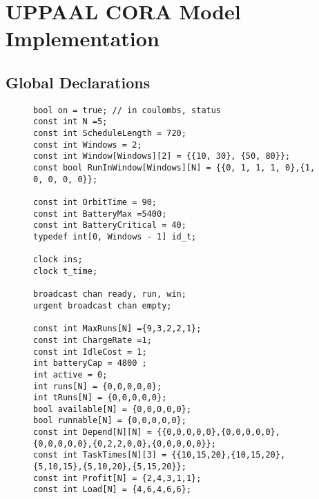 \chapter{UPPAAL CORA Model Implementation}\label{appendix:cora_models}

\section{Global Declarations}
\begin{figure}[H]
\begin{lstlisting}[language=my_c, caption={Global declarations}, label=lst:core_global_declarations_code0]
bool on = true; // in coulombs, status
const int N =5;
const int ScheduleLength = 720;
const int Windows = 2;
const int Window[Windows][2] = {{10, 30}, {50, 80}};
const bool RunInWindow[Windows][N] = {{0, 1, 1, 1, 0},{1, 0, 0, 0, 0}};

const int OrbitTime = 90;
const int BatteryMax =5400;
const int BatteryCritical = 40;
typedef int[0, Windows - 1] id_t;

clock ins;
clock t_time;

broadcast chan ready, run, win;
urgent broadcast chan empty;

const int MaxRuns[N] ={9,3,2,2,1};
const int ChargeRate =1;
const int IdleCost = 1;
int batteryCap = 4800 ;
int active = 0;
int runs[N] = {0,0,0,0,0};
int tRuns[N] = {0,0,0,0,0};
bool available[N] = {0,0,0,0,0};
bool runnable[N] = {0,0,0,0,0};
const int Depend[N][N] = {{0,0,0,0,0},{0,0,0,0,0},{0,0,0,0,0},{0,2,2,0,0},{0,0,0,0,0}};
const int TaskTimes[N][3] = {{10,15,20},{10,15,20},{5,10,15},{5,10,20},{5,15,20}};
const int Profit[N] = {2,4,3,1,1};
const int Load[N] = {4,6,4,6,6};
\end{lstlisting}
\end{figure}

